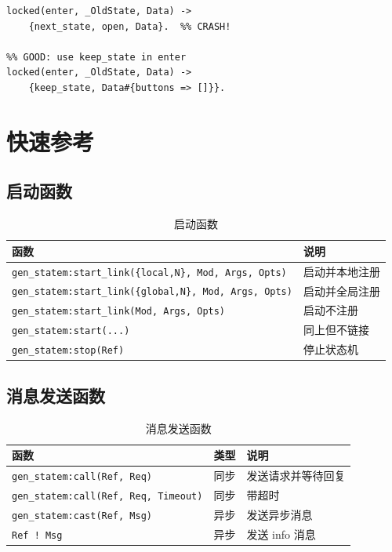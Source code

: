 \documentclass[a4paper,11pt]{article}
\begin{document}
\begin{lstlisting}[style=erlangstyle]
%% BAD: state enter must not change state
locked(enter, _OldState, Data) ->
    {next_state, open, Data}.  %% CRASH!

%% GOOD: use keep_state in enter
locked(enter, _OldState, Data) ->
    {keep_state, Data#{buttons => []}}.
\end{lstlisting}


\section{快速参考}

\subsection{启动函数}

\begin{table}[H]
\centering
\begin{tabular}{@{}ll@{}}
\toprule
\textbf{函数} & \textbf{说明} \\
\midrule
\texttt{gen\_statem:start\_link(\{local,N\}, Mod, Args, Opts)} & 启动并本地注册 \\
\texttt{gen\_statem:start\_link(\{global,N\}, Mod, Args, Opts)} & 启动并全局注册 \\
\texttt{gen\_statem:start\_link(Mod, Args, Opts)} & 启动不注册 \\
\texttt{gen\_statem:start(...)} & 同上但不链接 \\
\texttt{gen\_statem:stop(Ref)} & 停止状态机 \\
\bottomrule
\end{tabular}
\caption{启动函数}
\end{table}

\subsection{消息发送函数}

\begin{table}[H]
\centering
\begin{tabular}{@{}lll@{}}
\toprule
\textbf{函数} & \textbf{类型} & \textbf{说明} \\
\midrule
\texttt{gen\_statem:call(Ref, Req)} & 同步 & 发送请求并等待回复 \\
\texttt{gen\_statem:call(Ref, Req, Timeout)} & 同步 & 带超时 \\
\texttt{gen\_statem:cast(Ref, Msg)} & 异步 & 发送异步消息 \\
\texttt{Ref ! Msg} & 异步 & 发送 info 消息 \\
\bottomrule
\end{tabular}
\caption{消息发送函数}
\end{table}
\end{document}
